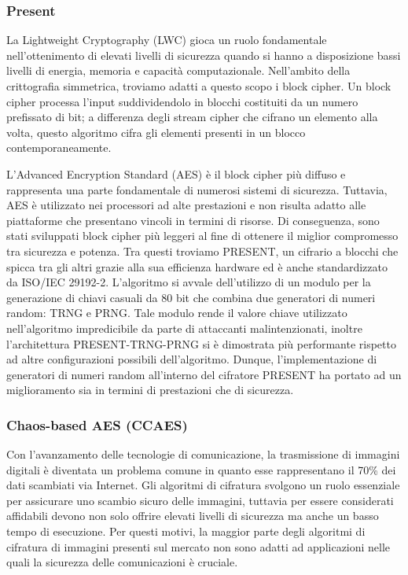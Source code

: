 \subsubsection{Present}
La Lightweight Cryptography (LWC) gioca un ruolo fondamentale nell'ottenimento di elevati livelli di sicurezza quando si hanno a disposizione bassi livelli di energia, memoria e capacità computazionale. Nell'ambito della crittografia simmetrica, troviamo adatti a questo scopo i block cipher. Un block cipher processa l'input suddividendolo in blocchi costituiti da un numero prefissato di bit; a differenza degli stream cipher che cifrano un elemento alla volta, questo algoritmo cifra gli elementi presenti in un blocco contemporaneamente. 

L'Advanced Encryption Standard (AES) è il block cipher più diffuso e rappresenta una parte fondamentale di numerosi sistemi di sicurezza. Tuttavia, AES è utilizzato nei processori ad alte prestazioni e non risulta adatto alle piattaforme che presentano vincoli in termini di risorse. Di conseguenza, sono stati sviluppati block cipher più leggeri al fine di ottenere il miglior compromesso tra sicurezza e potenza. Tra questi troviamo PRESENT, un cifrario a blocchi che spicca tra gli altri grazie alla sua efficienza hardware ed è anche standardizzato da ISO/IEC 29192-2. L'algoritmo si avvale dell'utilizzo di un modulo per la generazione di chiavi casuali da 80 bit che combina due generatori di numeri random: TRNG e PRNG. Tale modulo rende il valore chiave utilizzato nell'algoritmo impredicibile da parte di attaccanti malintenzionati, inoltre l'architettura PRESENT-TRNG-PRNG si è dimostrata \cite{kowsalya_low_2021} più performante rispetto ad altre configurazioni possibili dell'algoritmo. Dunque, l'implementazione di generatori di numeri random all'interno del cifratore PRESENT ha portato ad un miglioramento sia in termini di prestazioni che di sicurezza.  

\subsubsection{Chaos-based AES (CCAES)}
Con l'avanzamento delle tecnologie di comunicazione, la trasmissione di immagini digitali è diventata un problema comune in quanto esse rappresentano il 70\% dei dati scambiati via Internet. Gli algoritmi di cifratura svolgono un ruolo essenziale per assicurare uno scambio sicuro delle immagini, tuttavia per essere considerati affidabili devono non solo offrire elevati livelli di sicurezza ma anche un basso tempo di esecuzione. Per questi motivi, la maggior parte degli algoritmi di cifratura di immagini presenti sul mercato non sono adatti ad applicazioni nelle quali la sicurezza delle comunicazioni è cruciale. 

